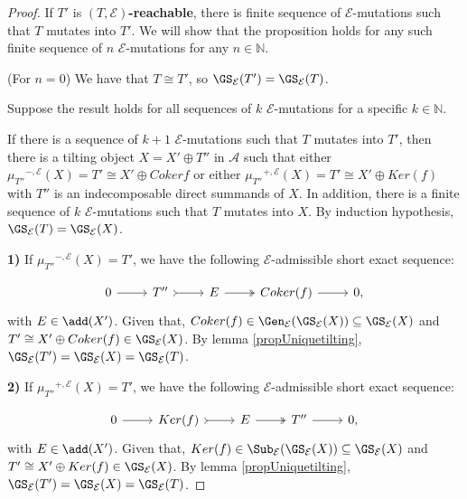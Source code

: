 \begin{proof}
If $T'$ is \textbf{$(T,\mathcal{E})$-reachable}, there is finite sequence of $\mathcal{E}$-mutations such that $T$ mutates into $T'$. We will show that the proposition holds for any such finite sequence of $n$ $\mathcal{E}$-mutations for any $n \in \mathbb{N}.$ 

(For $n=0$) We have that $T \cong T'$, so  $\GS_\mathcal{E}(T') = \GS_\mathcal{E}(T)$.

Suppose the result holds for all sequences of $k$ $\mathcal{E}$-mutations for a specific $k \in \mathbb{N}$.

If there is a sequence of $k+1$ $\mathcal{E}$-mutations such that $T$ mutates into $T'$, then there is a tilting object $X = X' \oplus T'' $ in $\mathscr{A}$ such that either ${\mu_{T''}}^{-,\mathcal{E}}(X) = T' \cong X' \oplus Cokerf$ or either ${\mu_{T''}}^{+,\mathcal{E}}(X) = T' \cong X' \oplus Ker(f)$ with $T''$ is an indecomposable direct summands of $X$. In addition, there is a finite sequence of $k$ $\mathcal{E}$-mutations such that $T$ mutates into $X$. By induction hypothesis, $\GS_\mathcal{E}(T) = \GS_\mathcal{E}(X)$. 

\bigskip

\textbf{1)} If ${\mu_{T''}}^{-,\mathcal{E}}(X) = T'$, we have the following $\mathcal{E}$-admissible short exact sequence: 

\[\begin{tikzcd}
	0 & T'' & E  & Coker(f)&  0,
	\arrow[from=1-1, to=1-2]
	\arrow[tail, from=1-2, to=1-3]
	\arrow[two heads,from=1-3, to=1-4]
	\arrow[from=1-4, to=1-5]
\end{tikzcd} \] with $E \in \add(X')$. Given that, $Coker(f) \in \Gen_\mathcal{E}(\GS_\mathcal{E}(X)) \subseteq \GS_\mathcal{E}(X)$ and $T' \cong X' \oplus Coker(f) \in \GS_\mathcal{E}(X)$. By lemma \ref{propUniquetilting}, $\GS_\mathcal{E}(T') = \GS_\mathcal{E}(X) = \GS_\mathcal{E}(T)$.

\bigskip

\textbf{2)} If ${\mu_{T''}}^{+,\mathcal{E}}(X) = T'$, we have the following $\mathcal{E}$-admissible short exact sequence: 

\[\begin{tikzcd}
	0 & Ker(f) & E  & T'' &  0,
	\arrow[from=1-1, to=1-2]
	\arrow[tail, from=1-2, to=1-3]
	\arrow[two heads,from=1-3, to=1-4]
	\arrow[from=1-4, to=1-5]
\end{tikzcd} \] with $E \in \add(X')$. Given that, $Ker(f) \in \Sub_\mathcal{E}(\GS_\mathcal{E}(X)) \subseteq \GS_\mathcal{E}(X)$ and $T' \cong X' \oplus Ker(f) \in \GS_\mathcal{E}(X)$. By lemma \ref{propUniquetilting}, $\GS_\mathcal{E}(T') = \GS_\mathcal{E}(X) = \GS_\mathcal{E}(T)$.







\end{proof}

